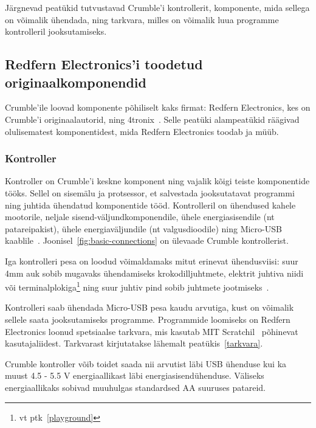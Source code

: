 \documentclass[12pt]{article}
\begin{document}
Järgnevad peatükid tutvustavad Crumble’i kontrollerit, komponente, mida sellega on võimalik ühendada, ning tarkvara, milles on võimalik luua programme kontrolleril jooksutamiseks.

\subsection{Redfern Electronics’i toodetud originaalkomponendid}
Crumble’ile loovad komponente põhiliselt kaks firmat: Redfern Electronics, kes on Crumble’i originaalautorid, ning 4tronix~\cite{4tronix}. Selle peatüki alampeatükid räägivad olulisematest komponentidest, mida Redfern Electronics toodab ja müüb.

\subsubsection{Kontroller} \label{sec:kontroller}

Kontroller on Crumble’i keskne komponent ning vajalik kõigi teiste komponentide tööks. Sellel on sisemälu ja protsessor, et salvestada jooksutatavat programmi ning juhtida ühendatud komponentide tööd. Kontrolleril on ühendused kahele mootorile, neljale sisend-väljundkomponendile, ühele energiasisendile (nt patareipakist), ühele energiaväljundile (nt valgusdioodile) ning Micro-USB kaablile~\cite{TheCrumbleController}. Joonisel~\ref{fig:basic-connections} on ülevaade Crumble kontrollerist.





Iga kontrolleri pesa on loodud võimaldamaks mitut erinevat ühendusviisi: suur 4mm auk sobib mugavaks ühendamiseks krokodilljuhtmete, elektrit juhtiva niidi või terminalplokiga\footnote{vt ptk~\ref{playground}} ning suur juhtiv pind sobib juhtmete jootmiseks~\cite{TheCrumbleController}.

Kontrolleri saab ühendada Micro-USB pesa kaudu arvutiga, kust on võimalik sellele saata jooksutamiseks programme. Programmide loomiseks on Redfern Electronics loonud spetsiaalse tarkvara, mis kasutab MIT Scratchil~\cite{Scratch-ImagineProgramShare} põhinevat kasutajaliidest. Tarkvarast kirjutatakse lähemalt peatükis~\ref{tarkvara}.

Crumble kontroller võib toidet saada nii arvutist läbi USB ühenduse kui ka muust 4.5 - 5.5 V energiaallikast läbi energiasisendühenduse. Väliseks energiaallikaks sobivad muuhulgas standardsed AA suuruses patareid.
\end{document}
